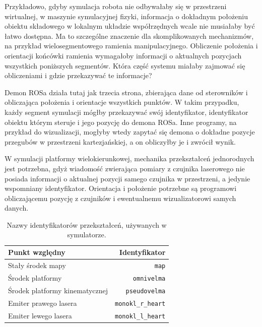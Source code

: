 	Przykładowo, gdyby symulacja robota nie odbywałaby się w przestrzeni wirtualnej, w maszynie symulacyjnej fizyki, 
	informacja o dokładnym położeniu obiektu składowego w lokalnym układzie współrzędnych wcale nie musiałaby być łatwo dostępna.
	Ma to szczególne znaczenie dla skomplikowanych mechanizmów, na przykład wielosegmentowego ramienia manipulacyjnego.
	Obliczenie położenia i orientacji końcówki ramienia wymagałoby informacji o aktualnych pozycjach wszystkich poniższych segmentów.
	Która część systemu miałaby zajmować się obliczeniami i gdzie przekazywać te informacje?
	
	Demon ROSa działa tutaj jak trzecia strona, zbierająca dane od sterowników i obliczająca położenia i orientacje wszystkich punktów.
	W takim przypadku, każdy segment symulacji mógłby przekazywać swój identyfikator, identyfikator obiektu którym steruje i jego pozycję do demona ROSa.
	Inne programy, na przykład do wizualizacji, mogłyby wtedy zapytać się demona o dokładne pozycje przegubów w przestrzeni kartezjańskiej, a on obliczyłby je i zwrócił wynik.
	
	W symulacji platformy wielokierunkowej, mechanika przekształceń jednorodnych jest potrzebna, gdyż wiadomość zwierająca pomiary z czujnika laserowego nie posiada informacji o aktualnej pozycji samego czujnika w przestrzeni, a jedynie wspomniany identyfikator. 
	Orientacja i położenie potrzebne są programowi obliczającemu pozycję z czujników i ewentualnemu wizualizatorowi samych danych.
	
	
	\begin{table}
		\centering
		\begin{tabular}{l r}
			Punkt względny & Identyfikator \\
			\hline
			Stały środek mapy & \texttt{map} \\
			Środek platformy & \texttt{omnivelma} \\
			Środek platformy kinematycznej & \texttt{pseudovelma} \\
			Emiter prawego lasera & \texttt{monokl\_r\_heart} \\
			Emiter lewego lasera & \texttt{monokl\_l\_heart} \\
		\end{tabular}
		\caption{Nazwy identyfikatorów przekształceń, używanych w symulatorze.}
		\label{tab:frames}
	\end{table}
		
